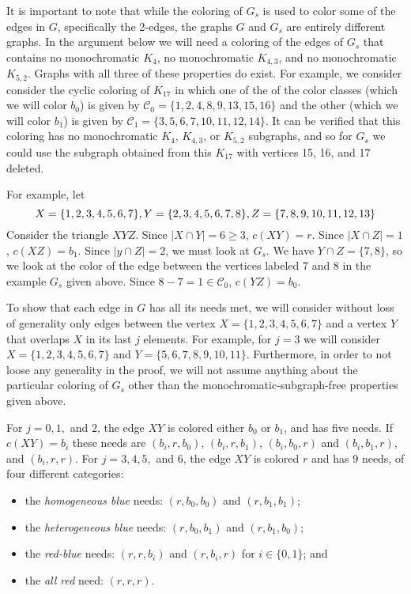 \documentclass{article}
\theoremstyle{definition}
\begin{document}
It is important to note that while the coloring of $G_{s}$ is used to color
some of the edges in $G$, specifically the 2-edges, the graphs $G$ and $G_{s}$
are entirely different graphs. In the argument below we will need a coloring of
the edges of $G_{s}$ that contains no monochromatic $K_{4}$, no monochromatic
$K_{4,3}$, and no monochromatic $K_{5,2}$. Graphs with all three of these
properties do exist. For example, we consider consider the cyclic coloring of
$K_{17}$ in which one of the of the color classes (which we will color $b_{0}$)
is given by $\mathcal{C}_{0} = \{1,2,4,8,9,13,15,16\}$ and the other (which we
will color $b_{1}$) is given by $\mathcal{C}_{1} = \{3,5,6,7,10,11,12,14\}$.
It can be verified that this coloring has no monochromatic $K_{4}$, $K_{4,3}$,
or $K_{5,2}$ subgraphs, and so for $G_{s}$ we could use the subgraph obtained
from this $K_{17}$ with vertices 15, 16, and 17 deleted.

For example, let
\begin{equation*}
  X =\{1, 2, 3, 4, 5, 6, 7\},\\
  Y =\{2, 3, 4, 5, 6, 7, 8\},\\
  Z =\{7, 8, 9, 10, 11, 12, 13\}
\end{equation*}
Consider the triangle $XYZ $.  Since $|X\cap Y| = 6 \geq 3$, $c(XY)=r$. Since
$|X\cap Z| = 1$, $c(XZ)=b_1$. Since $|y\cap Z| = 2$, we must look at $G_s$. We
have $Y\cap Z=\{7,8\}$, so we look at the color of the edge between
the vertices labeled 7 and 8 in the example $G_{s}$ given above. Since $8-7=1\in\mathcal{C}_0$, $c(YZ)=b_0$.


To show that each edge in $G$ has all its needs met, we will consider without
loss of generality only edges between the vertex $X = \{1, 2, 3, 4, 5, 6, 7\}$
and a vertex $Y$ that overlaps $X$ in its last $j$ elements. For example, for
$j=3$ we will consider $X = \{1,2,3,4,5,6,7\}$ and $Y = \{5,6,7,8,9,10,11\}$.
Furthermore, in order to not loose any generality in the proof, we will not
assume anything about the particular coloring of $G_{s}$ other than the
monochromatic-subgraph-free properties given above.

For $j=0,1,$ and $2$, the edge $XY$ is colored either $b_{0}$ or $b_{1}$, and
has five needs. If $c(XY)=b_{i}$ these needs are $(b_{i},r,b_{0})$,
$(b_{i},r,b_{1})$, $(b_{i},b_{0},r)$ and $(b_{i},b_{1},r)$, and $(b_{i},r,r)$.
For $j=3,4,5,$ and $6$, the edge $XY$ is colored $r$ and has 9 needs, of four
different categories:
\begin{itemize}
\item the \emph{homogeneous blue} needs: $(r,b_{0},b_{0})$ and $(r, b_{1}, b_{1})$;
\item the \emph{heterogeneous blue} needs: $(r,b_{0},b_{1})$ and $(r,b_{1},b_{0})$;
\item the \emph{red-blue} needs: $(r,r,b_{i})$ and $(r,b_{i},r)$ for $i \in
  \{0,1\}$; and
\item the \emph{all red} need: $(r,r,r)$.
\end{itemize}
\end{document}
